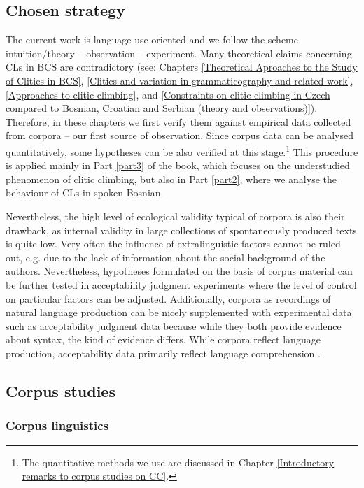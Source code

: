 \subsection{Chosen strategy}
\label{Chosen strategy}
The current work is language-use oriented and we follow the scheme intuition\slash theory – observation – experiment. Many theoretical claims concerning CLs in BCS are contradictory (see: Chapters \ref{Theoretical Aproaches to the Study of Clitics in BCS}, \ref{Clitics and variation in grammaticography and related work}, \ref{Approaches to clitic climbing}, and \ref{Constraints on clitic climbing in Czech compared to Bosnian, Croatian and Serbian (theory and observations)}). Therefore, in these chapters we first verify them against empirical data collected from corpora – our first source of observation. Since corpus data can be analysed quantitatively, some hypotheses can be also verified at this stage.\footnote{The quantitative methods we use are discussed in Chapter \ref{Introductory remarks to corpus studies on CC}.} This procedure is applied mainly in Part \ref{part3} of the book, which focuses on the understudied phenomenon of clitic climbing, but also in Part \ref{part2}, where we analyse the behaviour of CLs in spoken Bosnian. 

Nevertheless, the high level of ecological validity typical of corpora is also their drawback, as internal validity in large collections of spontaneously produced texts is quite low. Very often the influence of extralinguistic factors cannot be ruled out, e.g. due to the lack of information about the social background of the authors. Nevertheless, hypotheses formulated on the basis of corpus material can be further tested in acceptability judgment experiments where the level of control on particular factors can be adjusted. Additionally, corpora as recordings of natural language production can be nicely supplemented with experimental data such as acceptability judgment data because while they both provide evidence about syntax, the kind of evidence differs. While corpora reflect language production, acceptability data primarily reflect language comprehension \citep[3]{Myers17}.

\subsection{Corpus studies}
\subsubsection{Corpus linguistics}

